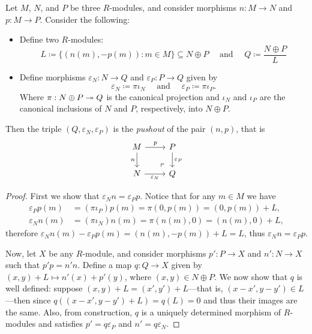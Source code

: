 \begin{proposition}[Pushout]
    \label{prop:pushout-modules}
    Let \(M\), \(N\), and \(P\) be three \(R\)-modules, and consider morphisms \(n:
    M \to N\) and \(p: M \to P\). Consider the following:
    \begin{itemize}\setlength\itemsep{0em}
        \item Define two \(R\)-modules:
              \[
                  L \coloneq \{(n(m), -p(m)) \colon m \in M\} \subseteq N \oplus P
                  \quad\text{ and } \quad
                  Q \coloneq \frac{N \oplus P}{L}
              \]
        \item Define morphisms \(\varepsilon_N: N \to Q\) and \(\varepsilon_P: P \to Q\)
              given by
              \[
                  \varepsilon_N \coloneq \pi \iota_N \quad\text{ and }\quad
                  \varepsilon_P \coloneq \pi \iota_P.
              \]
              Where \(\pi: N \oplus P \twoheadrightarrow Q\) is the canonical projection and \(\iota_N\)
              and \(\iota_P\) are the canonical inclusions of \(N\) and \(P\), respectively,
              into \(N \oplus P\).
    \end{itemize}
    Then the triple \((Q, \varepsilon_N, \varepsilon_P)\) is the \emph{pushout} of
    the pair \((n, p)\), that is
    \[
        \begin{tikzcd}
            M \ar[r, "p"] \ar[d, "n"'] \ar[rd, very near end, phantom, "\ulcorner"]
            &P \ar[d, "\varepsilon_P"] \\
            N \ar[r, "\varepsilon_N"'] &Q
        \end{tikzcd}
    \]
\end{proposition}

\begin{proof}
    First we show that \(\varepsilon_N n = \varepsilon_P p\). Notice that for any
    \(m \in M\) we have
    \begin{align*}
        \varepsilon_P p(m) & = (\pi \iota_P) p(m) = \pi(0, p(m)) = (0, p(m)) + L, \\
        \varepsilon_N n(m) & = (\pi \iota_N) n(m) = \pi(n(m), 0) = (n(m), 0) + L,
    \end{align*}
    therefore \(\varepsilon_N n(m) - \varepsilon_P p(m) = (n(m), -p(m)) + L = L\),
    thus \(\varepsilon_N n = \varepsilon_P p\).

    Now, let \(X\) be any \(R\)-module, and consider morphisms \(p': P \to X\) and
    \(n': N \to X\) such that \(p' p = n' n\). Define a map \(q: Q \to X\) given by
    \((x, y) + L \mapsto n'(x) + p'(y)\), where \((x, y) \in N \oplus P\). We now
    show that \(q\) is well defined: suppose \((x, y) + L = (x', y') + L\)---that
    is, \((x - x', y - y') \in L\)---then since
    \(q((x - x', y - y') + L) = q(L) = 0\) and thus their images are the same. Also,
    from construction, \(q\) is a uniquely determined morphism of \(R\)-modules and
    satisfies \(p' = q \varepsilon_P\) and \(n' = q \varepsilon_N\).
\end{proof}

